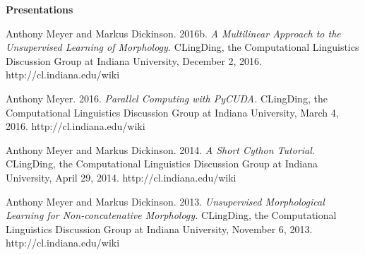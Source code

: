 \begin{singlespace}
\begin{description}
\end{description}
\thispagestyle{empty}
\centerline{\large\textbf{Presentations}}
\begin{description}
\item Anthony Meyer and Markus Dickinson. 2016b. \emph{A Multilinear Approach to the
Unsupervised Learning of Morphology.} CLingDing, the Computational Linguistics
Discussion Group at Indiana University, December 2, 2016.
http://cl.indiana.edu/wiki
\item  Anthony Meyer. 2016. \emph{Parallel Computing with PyCUDA.} CLingDing, the
Computational Linguistics Discussion Group at Indiana University, March 4,
2016. http://cl.indiana.edu/wiki
\item Anthony Meyer and Markus Dickinson. 2014. \emph{A Short Cython Tutorial.} CLingDing,
the Computational Linguistics Discussion Group at Indiana University, April 29,
2014. http://cl.indiana.edu/wiki
\item Anthony Meyer and Markus Dickinson. 2013. \emph{Unsupervised Morphological Learning
for Non-concatenative Morphology.} CLingDing, the Computational Linguistics
Discussion Group at Indiana University, November 6, 2013.
http://cl.indiana.edu/wiki
\end{description}
\vspace{18pt}






\end{singlespace}
